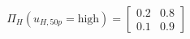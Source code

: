 \documentclass[border=3mm,preview]{standalone}\usepackage{amsmath}
\begin{document}
\[
\Pi_{H} \left( u_{H,50p} = \text{high} \right)= 
\left[\begin{array}{cc} 
0.2 & 0.8 \\ 
0.1 & 0.9 
\end{array}\right] \] 
\end{document}
